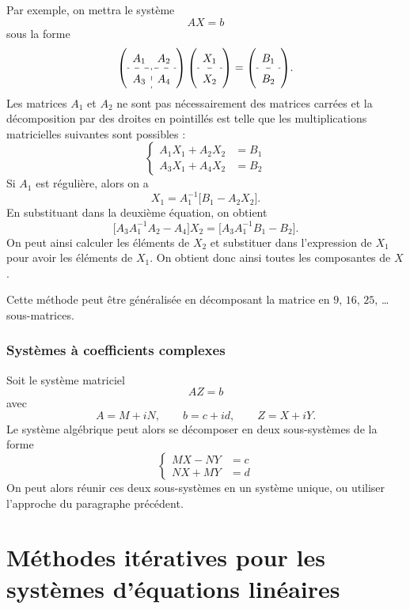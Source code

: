 Par exemple, on mettra le système
\[
  AX = b
\]
sous la forme
\[
  {\renewcommand{\arraystretch}{1.5}
  \left(\begin{array}{c:c}
    A_1 & A_2\\ \hdashline
    A_3 & A_4
  \end{array}\right)
  \left(\begin{array}{c}
    X_1\\ \hdashline
    X_2
  \end{array}\right)
  =
  \left(\begin{array}{c}
    B_1\\ \hdashline
    B_2
  \end{array}\right)}.
\]
Les matrices $A_1$ et $A_2$ ne sont pas nécessairement des matrices carrées et
la décomposition par des droites en pointillés est telle que les
multiplications matricielles suivantes sont possibles :
\[
  \left\{
  \begin{aligned}
    A_1X_1 + A_2X_2 &= B_1\\
    A_3X_1 + A_4X_2 &= B_2
  \end{aligned}
  \right.
\]
Si $A_1$ est régulière, alors on a
\[
  X_1 = A_1^{-1}\bigl[B_1 - A_2X_2\bigr].
\]
En substituant dans la deuxième équation, on obtient
\[
  \bigl[A_3A_1^{-1}A_2 - A_4\bigr]X_2 = \bigl[A_3A_1^{-1}B_1 - B_2\bigr].
\]
On peut ainsi calculer les éléments de $X_2$ et substituer dans l'expression
de $X_1$ pour avoir les éléments de $X_1$. On obtient donc ainsi toutes les
composantes de $X$.

Cette méthode peut être généralisée en décomposant la matrice en $9$, $16$,
$25$, \dots{} sous-matrices.

\subsubsection{Systèmes à coefficients complexes}

Soit le système matriciel
\[
  AZ = b
\]
avec
\[
  A = M + iN, \qquad b = c + id, \qquad Z = X + iY .
\]
Le système algébrique peut alors se décomposer en deux sous-systèmes de la
forme
\[
  \left\{
  \begin{aligned}
    MX - NY &= c\\
    NX + MY &= d
  \end{aligned}
  \right.
\]
On peut alors réunir ces deux sous-systèmes en un système unique, ou utiliser
l'approche du paragraphe précédent.

\section{Méthodes itératives pour les systèmes d'équations linéaires}

